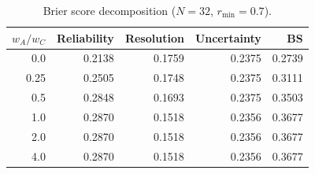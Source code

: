 \begin{table}[htbp]
\centering
\caption{Brier score decomposition ($N = 32$, $r_{\min} = 0.7$).}
\label{tab:brier_decomp}
\small
\begin{tabular}{@{}rrrrr@{}}
\toprule
  $w_A/w_C$ & Reliability & Resolution & Uncertainty & BS \\
\midrule
  0.0 & 0.2138 & 0.1759 & 0.2375 & 0.2739 \\
  0.25 & 0.2505 & 0.1748 & 0.2375 & 0.3111 \\
  0.5 & 0.2848 & 0.1693 & 0.2375 & 0.3503 \\
  1.0 & 0.2870 & 0.1518 & 0.2356 & 0.3677 \\
  2.0 & 0.2870 & 0.1518 & 0.2356 & 0.3677 \\
  4.0 & 0.2870 & 0.1518 & 0.2356 & 0.3677 \\
\bottomrule
\end{tabular}
\end{table}
